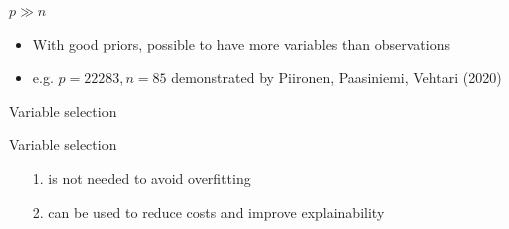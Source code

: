 \documentclass[english,t]{beamer}
\newenvironment{list1}{
   \begin{list}{$\color{list1}\bullet$}{\itemsep=6pt}}{
  \end{list}}
\newenvironment{list2}{
  \begin{list}{-}{\baselineskip=12pt\itemsep=2pt}}{
  \end{list}}
\begin{document}
\begin{frame}{$p \gg n$}

  \begin{itemize}
  \item With good priors, possible to have more variables than observations
  \item e.g. $p=22283, n=85$ demonstrated by Piironen, Paasiniemi,
    Vehtari (2020)
  \end{itemize}
\end{frame}


\begin{frame}{Variable selection}
  
  Variable selection
  \begin{itemize}
  \item[1.] is not needed to avoid overfitting
  \item[2.] can be used to reduce costs and improve explainability
  \end{itemize}

\end{frame}



\end{document}
